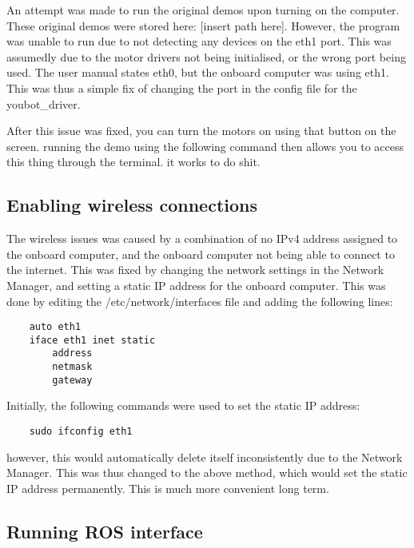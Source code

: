 \documentclass[a4paper, 12pt]{article}
\newif\ifshownotes
\newcommand{\notes}[1]{\ifshownotes\textcolor{blue}{#1}\fi}
\begin{document}
    An attempt was made to run the original demos upon turning on the computer. These original demos were stored here: [insert path here].
    However, the program was unable to run due to not detecting any devices on the eth1 port. This was assumedly due to the motor drivers not being initialised, or the wrong port being used. The user manual states eth0, but the onboard computer was using eth1. This was thus a simple fix of changing the port in the config file for the youbot\_driver. 

    
    After this issue was fixed, you can turn the motors on using that button on the screen. running the demo using the following command then allows you to access this thing through the terminal. it works to do shit.


    \subsection{Enabling wireless connections}

    The wireless issues was caused by a combination of no IPv4 address assigned to the onboard computer, and the onboard computer not being able to connect to the internet. This was fixed by changing the network settings in the Network Manager, and setting a static IP address for the onboard computer. This was done by editing the /etc/network/interfaces file and adding the following lines:

    \begin{verbatim}
    auto eth1
    iface eth1 inet static
        address
        netmask
        gateway
    \end{verbatim}

    Initially, the following commands were used to set the static IP address: 
    \begin{verbatim}
    sudo ifconfig eth1
    \end{verbatim}
    however, this would automatically delete itself inconsistently due to the Network Manager. This was thus changed to the above method, which would set the static IP address permanently. This is much more convenient long term. 


    \pagebreak


    \subsection{Running ROS interface}

    \notes{
        so what packages were there?
    }
\end{document}
